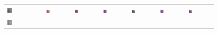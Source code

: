 \begin{figure}[h!]
\begin{tabular}{C{0.14\textwidth}C{0.14\textwidth}C{0.14\textwidth}C{0.14\textwidth}C{0.14\textwidth}C{0.14\textwidth}C{0.14\textwidth}}
		\includegraphics[width=0.14\textwidth]{images/p03/p03_02.png} &
		\includegraphics[width=0.14\textwidth]{images/gen/spatial_weight/p03_02.png_0.00.png} &
		\includegraphics[width=0.14\textwidth]{images/gen/spatial_weight/p03_02.png_0.33.png} &
		\includegraphics[width=0.14\textwidth]{images/gen/spatial_weight/p03_02.png_0.66.png} &
		\includegraphics[width=0.14\textwidth]{images/gen/spatial_weight/p03_02.png_1.00.png} &
		\includegraphics[width=0.14\textwidth]{images/gen/spatial_weight/p03_02.png_1.33.png} &
		\includegraphics[width=0.14\textwidth]{images/gen/spatial_weight/p03_02.png_1.66.png} \\
		\includegraphics[width=0.14\textwidth]{images/p03/p03_03.png} &

\end{tabular}
\end{figure}
